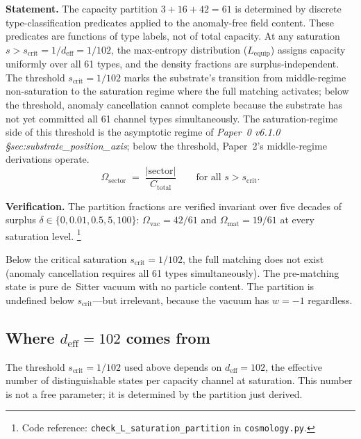 \documentclass[11pt]{article}
\newcommand{\coderef}[2]{\footnote{Code reference: \texttt{#1} in \texttt{#2}.}}
\begin{document}
\begin{tcolorbox}[apfbox, title={$L_{\mathrm{sat,part}}$ (Saturation-Independent Partition)}]
\textbf{Statement.}  The capacity partition $3 + 16 + 42 = 61$ is determined by discrete type-classification predicates applied to the anomaly-free field content.  These predicates are functions of type labels, not of total capacity.  At any saturation $s > s_{\mathrm{crit}} = 1/d_{\mathrm{eff}} = 1/102$, the max-entropy distribution ($L_{\mathrm{equip}}$) assigns capacity uniformly over all 61 types, and the density fractions are surplus-independent. The threshold $s_{\mathrm{crit}} = 1/102$ marks the substrate's transition from middle-regime non-saturation to the saturation regime where the full matching activates; below the threshold, anomaly cancellation cannot complete because the substrate has not yet committed all 61 channel types simultaneously. The saturation-regime side of this threshold is the asymptotic regime of \emph{Paper~0 v6.1.0 \S sec:substrate\_position\_axis}; below the threshold, Paper~2's middle-regime derivations operate.
\begin{equation}
\Omega_{\mathrm{sector}} \;=\; \frac{|\mathrm{sector}|}{C_{\mathrm{total}}} \qquad \text{for all } s > s_{\mathrm{crit}}.
\label{eq:omega_sector}
\end{equation}

\smallskip\noindent\textbf{Verification.}  The partition fractions are verified invariant over five decades of surplus $\delta \in \{0, 0.01, 0.5, 5, 100\}$: $\Omega_{\mathrm{vac}} = 42/61$ and $\Omega_{\mathrm{mat}} = 19/61$ at every saturation level.
\coderef{check\_L\_saturation\_partition}{cosmology.py}
\end{tcolorbox}

Below the critical saturation $s_{\mathrm{crit}} = 1/102$, the full matching does not exist (anomaly cancellation requires all 61 types simultaneously).  The pre-matching state is pure de~Sitter vacuum with no particle content.  The partition is undefined below $s_{\mathrm{crit}}$---but irrelevant, because the vacuum has $w = -1$ regardless.


\subsection{Where \texorpdfstring{$d_{\mathrm{eff}} = 102$}{deff = 102} comes from}
\label{sec:deff}

The threshold $s_{\mathrm{crit}} = 1/102$ used above depends on $d_{\mathrm{eff}} = 102$, the effective number of distinguishable states per capacity channel at saturation.  This number is not a free parameter; it is determined by the partition just derived.
\end{document}
